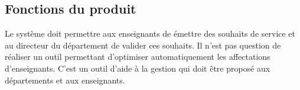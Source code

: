 %
%
%
%
%
%
%
%


	\subsection{Fonctions du produit}
Le système doit permettre aux enseignants de émettre des souhaits de service et au directeur du département de valider ces souhaits.
Il n’est pas question de réaliser un outil permettant d’optimiser automatiquement les affectations d’enseignants. 
C’est un outil d’aide à la gestion qui doit être proposé aux départements et aux enseignants.

